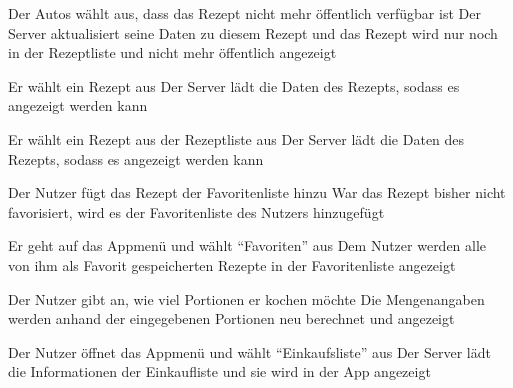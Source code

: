 {Der Autos wählt aus, dass das Rezept nicht mehr öffentlich verfügbar ist}
{Der Server aktualisiert seine Daten zu diesem Rezept und das Rezept wird nur noch in der Rezeptliste und nicht mehr öffentlich angezeigt}


{Er wählt ein Rezept aus}
{Der Server lädt die Daten des Rezepts, sodass es angezeigt werden kann}

{Er wählt ein Rezept aus der Rezeptliste aus}
{Der Server lädt die Daten des Rezepts, sodass es angezeigt werden kann}



{Der Nutzer fügt das Rezept der \gls{Favoritenliste} hinzu}
{War das Rezept bisher nicht favorisiert, wird es der Favoritenliste des Nutzers hinzugefügt}

{Er geht auf das Appmenü und wählt "`Favoriten"' aus}
{Dem Nutzer werden alle von ihm als Favorit gespeicherten Rezepte in der \gls{Favoritenliste} angezeigt}






{Der Nutzer gibt an, wie viel Portionen er kochen möchte}
{Die Mengenangaben werden anhand der eingegebenen Portionen neu berechnet und angezeigt}


{Der Nutzer öffnet das Appmenü und wählt "`Einkaufsliste"' aus}
{Der Server lädt die Informationen der Einkaufliste und sie wird in der App angezeigt}

